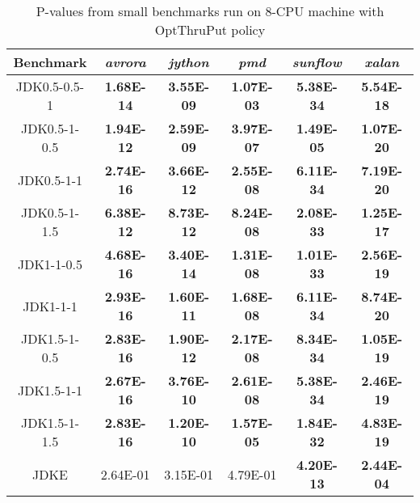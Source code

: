 \begin{table} [H]
\caption{P-values from small benchmarks run on 8-CPU  machine with OptThruPut
policy}
\begin{tabular}[H]{|c|c|c|c|c|c|}
\hline

Benchmark & \emph{avrora} & \emph{jython} & \emph{pmd} & \emph{sunflow}
& \emph{xalan}\tabularnewline
\hline
JDK0.5-0.5-1 & \textbf{1.68E-14} & \textbf{3.55E-09} & \textbf{1.07E-03} & \textbf{5.38E-34} &
\textbf{5.54E-18}\tabularnewline \hline

JDK0.5-1-0.5 &\textbf{1.94E-12 }&\textbf{ 2.59E-09} &\textbf{ 3.97E-07} & \textbf{1.49E-05 }&
\textbf{1.07E-20}\tabularnewline\hline

JDK0.5-1-1 &\textbf{ 2.74E-16} & \textbf{3.66E-12} & \textbf{2.55E-08} & \textbf{6.11E-34} &
\textbf{7.19E-20}\tabularnewline\hline

JDK0.5-1-1.5 &\textbf{ 6.38E-12} & \textbf{8.73E-12} & \textbf{8.24E-08} & \textbf{2.08E-33} &
\textbf{1.25E-17}\tabularnewline \hline

JDK1-1-0.5 &\textbf{ 4.68E-16} & \textbf{3.40E-14} & \textbf{1.31E-08} & \textbf{1.01E-33} &
\textbf{2.56E-19}\tabularnewline \hline

JDK1-1-1 & \textbf{2.93E-16} & \textbf{1.60E-11} & \textbf{1.68E-08} & \textbf{6.11E-34} &
\textbf{8.74E-20}\tabularnewline \hline

JDK1.5-1-0.5 &\textbf{ 2.83E-16} & \textbf{1.90E-12} & \textbf{2.17E-08} &\textbf{ 8.34E-34} &
\textbf{1.05E-19}\tabularnewline \hline

JDK1.5-1-1 &\textbf{ 2.67E-16} & \textbf{3.76E-10} & \textbf{2.61E-08} & \textbf{5.38E-34} &
\textbf{2.46E-19}\tabularnewline\hline

JDK1.5-1-1.5 &\textbf{ 2.83E-16} & \textbf{1.20E-10} & \textbf{1.57E-05} & \textbf{1.84E-32} &
\textbf{4.83E-19}\tabularnewline\hline

JDKE & 2.64E-01 & 3.15E-01 & 4.79E-01 &
\textbf{4.20E-13} &\textbf{ 2.44E-04}\tabularnewline \hline
\end{tabular}
\end{table}
